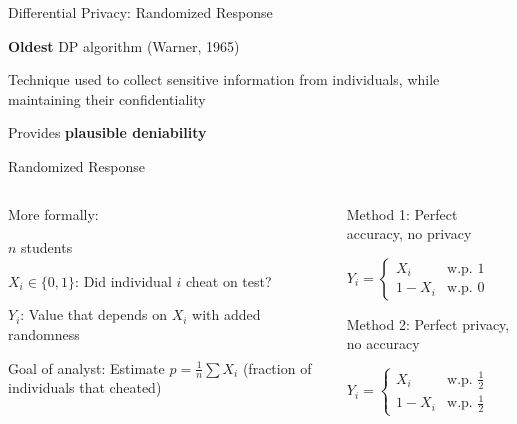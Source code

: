 \documentclass[12pt,aspectratio=169]{beamer}
\begin{document}
\begin{frame}{Differential Privacy: Randomized Response}

\textbf{Oldest} DP algorithm (Warner, 1965)

Technique used to collect sensitive information from individuals, while maintaining their confidentiality

Provides \textbf{plausible deniability}

\end{frame}

\begin{frame}{Randomized Response}

\begin{columns}[T]

\begin{column}{.5\textwidth}

\begin{block}{More formally:}

  $n$ students
  
  $X_i \in \{0,1\}$: Did individual $i$ cheat on test?
  
  $Y_i$: Value that depends on $X_i$ with added randomness
  
  Goal of analyst: Estimate $p = \frac{1}{n} \sum X_i$ (fraction of individuals that cheated)
\end{block}

\end{column}

\begin{column}{.5\textwidth}

\begin{block}{Method 1: Perfect accuracy, no privacy}

$Y_i = \begin{cases} X_i & \text{w.p. } 1 \\ 1 - X_i & \text{w.p. } 0 \end{cases}$

\end{block}

\begin{block}{Method 2: Perfect privacy, no accuracy}

$Y_i = \begin{cases} X_i & \text{w.p. } \frac{1}{2} \\ 1 - X_i & \text{w.p. } \frac{1}{2} \end{cases}$

\end{block}

\end{column}
\end{columns}


\end{frame}
\end{document}
